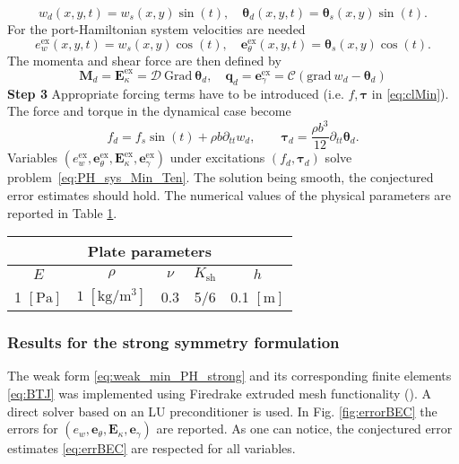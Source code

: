 \[
w_d(x,y,t) = w_s(x,y) \sin(t), \quad \bm{\theta}_d(x,y,t) = \bm\theta_s(x,y) \sin(t).
\]
For the port-Hamiltonian system velocities are needed
\[
e_w^\text{ex}(x,y,t) = w_s(x,y) \cos(t), \quad \bm{e}_\theta^\text{ex}(x,y,t) = \bm\theta_s(x,y) \cos(t).
\]
The momenta and shear force are then defined by
\[
\bm{M}_d = \bm{E}_\kappa^\text{ex} =  \mathcal{D} \ \mathrm{Grad} \ \bm{\theta}_d, \quad \bm{q}_d = \bm{e}_\gamma^\text{ex} = \mathcal{C}(\mathrm{grad} \ w_d - \bm{\theta}_d)
\]
\textbf{Step 3 } Appropriate forcing terms have to be introduced (i.e. $f, \bm{\tau}$ in \eqref{eq:clMin}). The force and torque in the dynamical case become
\begin{equation*}
f_d = f_s \sin(t) + \rho b \partial_{tt} w_d, \qquad
\bm{\tau}_d = \frac{\rho b^3}{12} \partial_{tt} \bm{\theta}_d.
\end{equation*}
Variables $(e_w^\text{ex}, \bm{e}_\theta^\text{ex}, \bm{E}_\kappa^\text{ex}, \bm{e}_\gamma^\text{ex})$ under excitations $(f_d, \bm{\tau}_d)$ solve problem~\eqref{eq:PH_sys_Min_Ten}. The solution being smooth, the conjectured error estimates should hold. The numerical values of the physical parameters are reported in Table \ref{tab:parMin}.

\begin{table}[h]
	\centering
	\begin{tabular}{ccccc}
		\hline 
		\multicolumn{5}{c}{Plate parameters} \\ 
		\hline 
		$E$ & $\rho$ & $\nu$ & $K_{\text{sh}}$ & $h$ \\
		1 $[\textrm{Pa}]$ & $1\; [\textrm{kg}/\textrm{m}^3]$ & 0.3 & 5/6 & 0.1 $[\textrm{m}]$\\ 
		\hline 
	\end{tabular} 
	\captionsetup{width=0.95\linewidth}
	\vspace{1mm}
	\label{tab:parMin}
\end{table}

\subsubsection{Results for the strong symmetry formulation} 

The weak form \eqref{eq:weak_min_PH_strong} and its corresponding finite elements \eqref{eq:BTJ} was implemented using Firedrake extruded mesh functionality (\cite{firedrake_extruded}). A direct solver based on an LU preconditioner is used. In Fig. \ref{fig:errorBEC} the errors for $(e_w, \bm{e}_\theta, \bm{E}_\kappa, \bm{e}_\gamma)$ are reported. As one can notice, the conjectured error estimates \eqref{eq:errBEC} are respected for all variables. 

